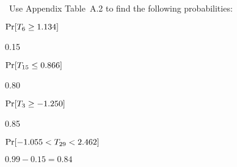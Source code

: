 \begin{problem}
  ~Use Appendix Table~A.2 to find the following probabilities:
\end{problem}

\begin{subproblem}
  $\Pr\lbrack T_6 \geq 1.134\rbrack$
\end{subproblem}

0.15

\begin{subproblem}
  $\Pr\lbrack T_{15} \leq 0.866\rbrack$
\end{subproblem}

0.80

\begin{subproblem}
  $\Pr\lbrack T_3 \geq -1.250\rbrack$
\end{subproblem}

0.85

\begin{subproblem}
  $\Pr\lbrack-1.055 < T_{29} < 2.462\rbrack$
\end{subproblem}

${0.99 - 0.15 = 0.84}$
